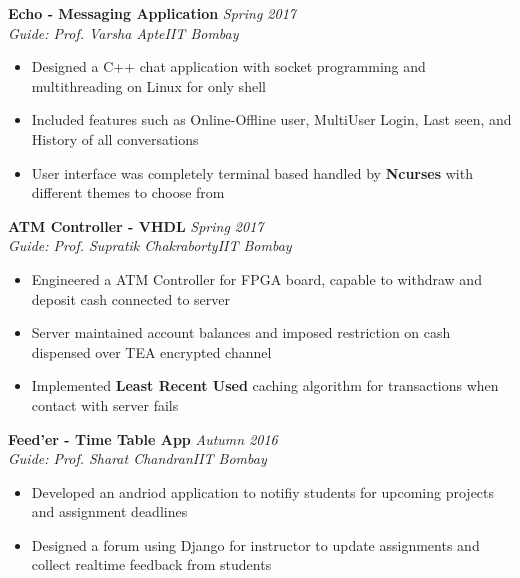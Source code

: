 \documentclass{article}
\begin{document}
\textbf{Echo - Messaging Application} \hfill{\sl \small Spring 2017}
  \vspace{1pt}\\
  {\it Guide: Prof. Varsha Apte}\hfill{\sl \small IIT Bombay}\\
  \vspace{-17pt}
    \begin{itemize}[itemsep = -0.75 mm, leftmargin=*]
      \item Designed a C++ chat application with socket programming and multithreading on Linux for only shell 
      \item Included features such as Online-Offline user, MultiUser Login, Last seen, and History of all conversations
      \item User interface was completely terminal based handled by \textbf{Ncurses} with different themes to choose from
    \end{itemize}
\textbf{ATM Controller - VHDL} \hfill{\sl \small Spring 2017}
  \vspace{1pt}\\
  {\it Guide: Prof. Supratik Chakraborty}\hfill{\sl \small IIT Bombay}\\
  \vspace{-17pt}
    \begin{itemize}[itemsep = -0.75 mm, leftmargin=*]
      \item Engineered a ATM Controller for FPGA board, capable to withdraw and deposit cash connected to server
      \item Server maintained account balances and imposed restriction on cash dispensed over TEA encrypted channel 
      \item Implemented \textbf{Least Recent Used} caching algorithm for transactions when contact with server fails
    \end{itemize}
\textbf{Feed'er - Time Table App} \hfill{\sl \small Autumn 2016}
  \vspace{1pt}\\
  {\it Guide: Prof. Sharat Chandran}\hfill{\sl \small IIT Bombay}\\
  \vspace{-17pt}
    \begin{itemize}[itemsep = -0.75 mm, leftmargin=*]
      \item Developed an andriod application to notifiy students for upcoming projects and assignment deadlines
      \item Designed a forum using Django for instructor to update assignments and collect realtime feedback from students 
    \end{itemize}
\end{document}
